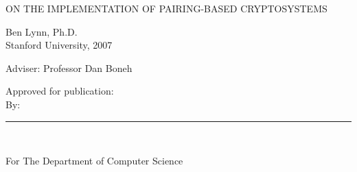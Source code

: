 \documentclass[12pt]{report}
\def\title{On the Implementation of Pairing-Based Cryptosystems}
\def\author{Ben Lynn}
\def\year{2007}
\def\principaladviser{Professor Dan Boneh}
\def\department{The Department of Computer Science}
\begin{document}
\pagestyle{empty}

\leavevmode
\vfill


\begin{center}

    \Large\uppercase\expandafter
    {\title}

\end{center}

\begin{center}

    \author, Ph.D. \\
    Stanford University, \year \\

    \vspace{\baselineskip}

    Adviser:  \principaladviser

\end{center}

{}




\vfill

\hfill\parbox{3.2in}{\raggedright Approved for publication: \\[4mm]

              By:\hfill\rule[-2mm]{74mm}{0.4pt} \\[3pt]
    \hfill \parbox{74mm}{\raggedright For \department} }
\end{document}
